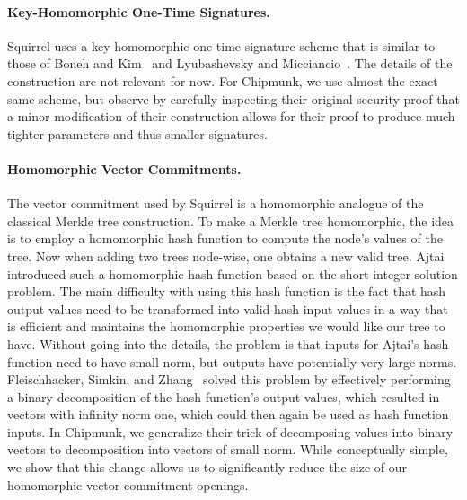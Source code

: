 \paragraph{Key-Homomorphic One-Time Signatures.}
Squirrel uses a key homomorphic one-time signature scheme that is similar to those of Boneh and Kim~\cite{BonKim2020} and Lyubashevsky and Micciancio~\cite{TCC:LyuMic08}.
The details of the construction are not relevant for now.
For Chipmunk, we use almost the exact same scheme, but observe by carefully inspecting their original security proof that a minor modification of their construction allows for their proof to produce much tighter parameters and thus smaller signatures.

\paragraph{Homomorphic Vector Commitments.}
The vector commitment used by Squirrel is a homomorphic analogue of the classical Merkle tree construction.
To make a Merkle tree homomorphic, the idea is to employ a homomorphic hash function to compute the node's values of the tree.
Now when adding two trees node-wise, one obtains a new valid tree.
Ajtai~\cite{ICALP:Ajtai99} introduced such a homomorphic hash function based on the short integer solution problem.
The main difficulty with using this hash function is the fact that hash output values need to be transformed into valid hash input values in a way that is efficient and maintains the homomorphic properties we would like our tree to have.
Without going into the details, the problem is that inputs for Ajtai's hash function need to have small norm, but outputs have potentially very large norms.
Fleischhacker, Simkin, and Zhang~\cite{CCS:FleSimZha22} solved this problem by effectively performing a binary decomposition of the hash function's output values, which resulted in vectors with infinity norm one, which could then again be used as hash function inputs.
In Chipmunk, we generalize their trick of decomposing values into binary vectors to decomposition into vectors of small norm.
While conceptually simple, we show that this change allows us to significantly reduce the size of our homomorphic vector commitment openings.

